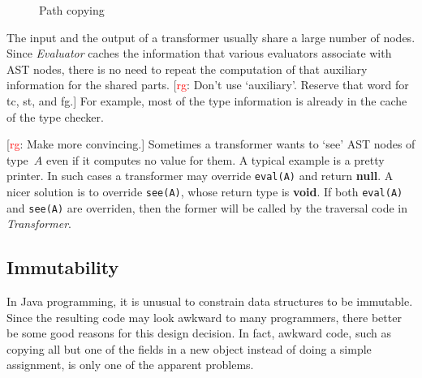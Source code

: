 \documentclass{llncs}
\newcommand{\jmlCode}{\lstinline[style=jml,basicstyle=\normalsize]}
\newcommand{\rg}[1]{{\small [\textcolor{red}{rg}: #1]}}
\begin{document}
\begin{figure}\centering
{}
\caption{Path copying}\label{fig:path-copying}
\end{figure}

The input and the output of a transformer usually share a large number of
nodes. Since \textit{Evaluator} caches the information that various
evaluators associate with AST nodes, there is no need to repeat the
computation of that auxiliary information for the shared parts. \rg{Don't
use `auxiliary'. Reserve that word for tc, st, and fg.} For example, most
of the type information is already in the cache of the type checker.

\rg{Make more convincing.}
Sometimes a transformer wants to `see' AST nodes of type~$A$
even if it computes no value for them. A typical example is
a pretty printer. In such cases a transformer may override
\jmlCode|eval(A)| and return \textbf{null}. A nicer solution is
to override \jmlCode|see(A)|, whose return type is \textbf{void}.
If both \jmlCode|eval(A)| and \jmlCode|see(A)| are overriden,
then the former will be called by the traversal code in
\textit{Transformer}.

\subsection{Immutability} %
\label{sec:design.immutability}

In Java programming, it is unusual to constrain data structures
to be immutable. Since the resulting code may look awkward to
many programmers, there better be some good reasons for this
design decision. In fact, awkward code, such as copying all but
one of the fields in a new object instead of doing a simple
assignment, is only one of the apparent problems.
\end{document}
